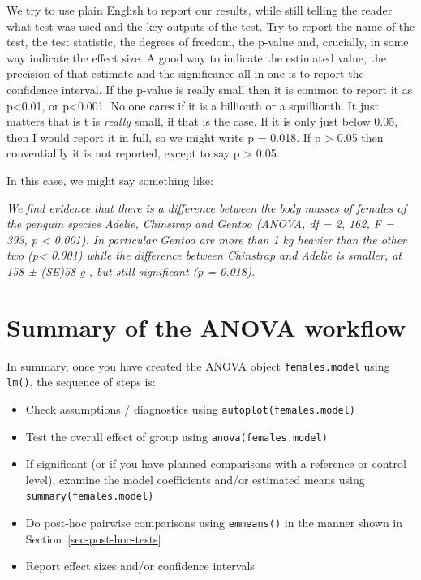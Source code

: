 \documentclass[
  letterpaper,
  DIV=11,
  numbers=noendperiod]{scrreprt}
\providecommand{\tightlist}{%
  \setlength{\itemsep}{0pt}\setlength{\parskip}{0pt}}\usepackage{longtable,booktabs,array}
\begin{document}
We try to use plain English to report our results, while still telling
the reader what test was used and the key outputs of the test. Try to
report the name of the test, the test statistic, the degrees of freedom,
the p-value and, crucially, in some way indicate the effect size. A good
way to indicate the estimated value, the precision of that estimate and
the significance all in one is to report the confidence interval. If the
p-value is really small then it is common to report it as
p\textless0.01, or p\textless0.001. No one cares if it is a billionth or
a squillionth. It just matters that is t is \emph{really} small, if that
is the case. If it is only just below 0.05, then I would report it in
full, so we might write p = 0.018. If p \textgreater{} 0.05 then
conventiallly it is not reported, except to say p \textgreater{} 0.05.

In this case, we might say something like:

\emph{We find evidence that there is a difference between the body
masses of females of the penguin species Adelie, Chinstrap and Gentoo
(ANOVA, df = 2, 162, F = 393, p \textless{} 0.001). In particular Gentoo
are more than 1 kg heavier than the other two (p\textless{} 0.001) while
the difference between Chinstrap and Adelie is smaller, at 158 ± (SE)58
g , but still significant (p = 0.018).}

\section{Summary of the ANOVA
workflow}\label{summary-of-the-anova-workflow}

In summary, once you have created the ANOVA object
\texttt{females.model} using \texttt{lm()}, the sequence of steps is:

\begin{itemize}
\tightlist
\item
  Check assumptions / diagnostics using \texttt{autoplot(females.model)}
\item
  Test the overall effect of group using \texttt{anova(females.model)}
\item
  If significant (or if you have planned comparisons with a reference or
  control level), examine the model coefficients and/or estimated means
  using \texttt{summary(females.model)}
\item
  Do post-hoc pairwise comparisons using \texttt{emmeans()} in the
  manner shown in Section~\ref{sec-post-hoc-tests}
\item
  Report effect sizes and/or confidence intervals
\end{itemize}
\end{document}
